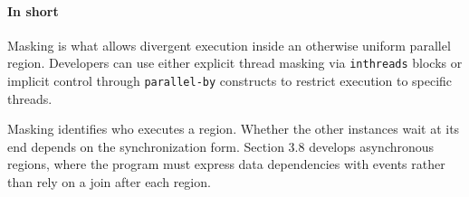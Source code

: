 \paragraph*{In short}

Masking is what allows divergent execution inside an otherwise uniform parallel region. Developers can use either explicit thread masking via \texttt{inthreads} blocks or implicit control through \texttt{parallel-by} constructs to restrict execution to specific threads.

Masking identifies who executes a region. Whether the other instances wait at its end depends on the synchronization form. Section 3.8 develops asynchronous regions, where the program must express data dependencies with events rather than rely on a join after each region.
